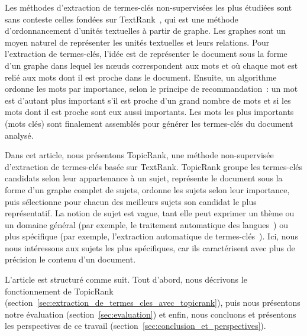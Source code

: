   Les méthodes d'extraction de termes-clés non-supervisées les plus étudiées
  sont sans conteste celles fondées sur TextRank~\cite{mihalcea2004textrank},
  qui est une méthode d'ordonnancement d'unités textuelles à partir de graphe.
  Les graphes sont un moyen naturel de représenter les unités textuelles et
  leurs relations. Pour l'extraction de termes-clés, l'idée est de représenter
  le document sous la forme d'un graphe dans lequel les n\oe{}uds correspondent
  aux mots et où chaque mot est relié aux mots dont il est proche dans le
  document. Ensuite, un algorithme ordonne les mots par importance, selon le
  principe de recommandation~: un mot est d'autant plus important s'il est
  proche d'un grand nombre de mots et si les mots dont il est proche sont eux
  aussi importants. Les mots les plus importants (mots clés) sont finalement
  assemblés pour générer les termes-clés du document analysé.

  Dans cet article, nous présentons TopicRank, une méthode non-supervisée
  d'extraction de termes-clés basée sur TextRank. TopicRank groupe les
  termes-clés candidats selon leur appartenance à un sujet, représente le
  document sous la forme d'un graphe complet de sujets, ordonne les sujets selon
  leur importance, puis sélectionne pour chacun des meilleurs sujets son
  candidat le plus représentatif. La notion de sujet est vague, tant elle peut
  exprimer un thème ou un domaine général (par exemple, \og le traitement
  automatique des langues~\fg) ou plus spécifique (par exemple, \og l'extraction
  automatique de termes-clés~\fg). Ici, nous nous intéressons aux sujets les
  plus spécifiques, car ils caractérisent avec plus de précision le contenu d'un
  document.

  L'article est structuré comme suit. Tout d'abord, nous décrivons le
  fonctionnement de TopicRank
  (section~\ref{sec:extraction_de_termes_cles_avec_topicrank}), puis nous
  présentons notre évaluation (section~\ref{sec:evaluation}) et enfin, nous
  concluons et présentons les perspectives de ce travail
  (section~\ref{sec:conclusion_et_perspectives}).
